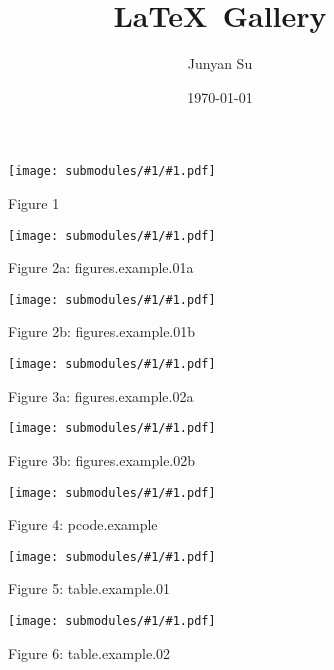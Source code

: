 \documentclass{article}
\title{\LaTeX\, Gallery}
\author{Junyan Su}
\date{\today}
\begin{document}
\maketitle
\newcommand{\includeSubmodule}[2]{
    \begin{figure}[ht]
        \begin{center}
            \texttt{[image: submodules/\#1/\#1.pdf]}
        \end{center} 
        \caption*{Figure #1#2}
    \end{figure}
}
\includeSubmodule{1}{}
\includeSubmodule{2a}{: figures.example.01a}
\includeSubmodule{2b}{: figures.example.01b}
\includeSubmodule{3a}{: figures.example.02a}
\includeSubmodule{3b}{: figures.example.02b}
\includeSubmodule{4}{: pcode.example}
\includeSubmodule{5}{: table.example.01}
\includeSubmodule{6}{: table.example.02}

%
%
\end{document}
